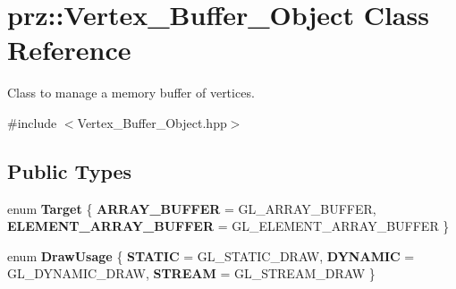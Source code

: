 \hypertarget{classprz_1_1_vertex___buffer___object}{}\section{prz\+::Vertex\+\_\+\+Buffer\+\_\+\+Object Class Reference}
\label{classprz_1_1_vertex___buffer___object}


Class to manage a memory buffer of vertices.  




{\ttfamily \#include $<$Vertex\+\_\+\+Buffer\+\_\+\+Object.\+hpp$>$}

\subsection*{Public Types}
\begin{DoxyCompactItemize}
\item 
\mbox{\label{classprz_1_1_vertex___buffer___object_a22e97683138a3109923dba7e21f2345c}} 
enum {\bfseries Target} \{ {\bfseries A\+R\+R\+A\+Y\+\_\+\+B\+U\+F\+F\+ER} = G\+L\+\_\+\+A\+R\+R\+A\+Y\+\_\+\+B\+U\+F\+F\+ER, 
{\bfseries E\+L\+E\+M\+E\+N\+T\+\_\+\+A\+R\+R\+A\+Y\+\_\+\+B\+U\+F\+F\+ER} = G\+L\+\_\+\+E\+L\+E\+M\+E\+N\+T\+\_\+\+A\+R\+R\+A\+Y\+\_\+\+B\+U\+F\+F\+ER
 \}
\item 
\mbox{\label{classprz_1_1_vertex___buffer___object_a2a2aa27fbdbcc99867ba06bf18485bfb}} 
enum {\bfseries Draw\+Usage} \{ {\bfseries S\+T\+A\+T\+IC} = G\+L\+\_\+\+S\+T\+A\+T\+I\+C\+\_\+\+D\+R\+AW, 
{\bfseries D\+Y\+N\+A\+M\+IC} = G\+L\+\_\+\+D\+Y\+N\+A\+M\+I\+C\+\_\+\+D\+R\+AW, 
{\bfseries S\+T\+R\+E\+AM} = G\+L\+\_\+\+S\+T\+R\+E\+A\+M\+\_\+\+D\+R\+AW
 \}
\end{DoxyCompactItemize}

